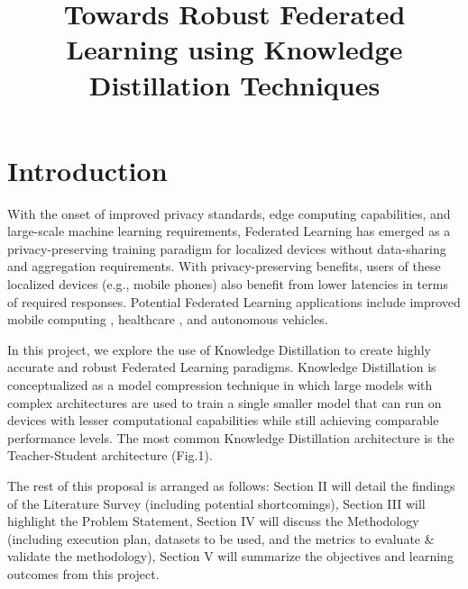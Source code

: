 \documentclass[conference]{IEEEtran}
\begin{document}
\title{Towards Robust Federated Learning using Knowledge Distillation Techniques\\}

\author{
\and
{}
}

\maketitle

\section{Introduction}
With the onset of improved privacy standards, edge computing capabilities, and large-scale machine learning requirements, Federated Learning has emerged as a privacy-preserving training paradigm for localized devices without data-sharing and aggregation requirements. With privacy-preserving benefits, users of these localized devices (e.g., mobile phones) also benefit from lower latencies in terms of required responses. Potential Federated Learning applications include improved mobile computing \cite{b1}, healthcare \cite{b2}, and autonomous vehicles. 

In this project, we explore the use of Knowledge Distillation to create highly accurate and robust Federated Learning paradigms. Knowledge Distillation is conceptualized as a model compression technique in which large models with complex architectures are used to train a single smaller model that can run on devices with lesser computational capabilities while still achieving comparable performance levels. The most common Knowledge Distillation architecture is the Teacher-Student architecture (Fig.1). 

The rest of this proposal is arranged as follows: Section II will detail the findings of the Literature Survey (including potential shortcomings), Section III will highlight the Problem Statement, Section IV will discuss the Methodology (including execution plan, datasets to be used, and the metrics to evaluate \& validate the methodology), Section V will summarize the objectives and learning outcomes from this project.
\end{document}
